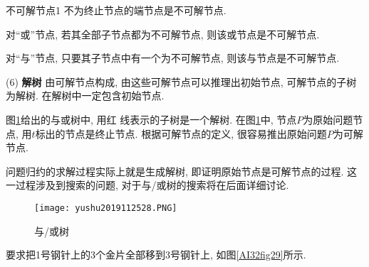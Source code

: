 \begin{mydef}{不可解节点}{1}
 不为终止节点的端节点是不可解节点.

 对“或”节点, 若其全部子节点都为不可解节点, 则该或节点是不可解节点.

 对“与”节点, 只要其子节点中有一个为不可解节点, 则该与节点是不可解节点.
\end{mydef}

(6) \textbf{解树} 由可解节点构成, 由这些可解节点可以推理出初始节点, 可解节点的子树为解树. 在解树中一定包含初始节点.
\begin{example}
    图\ref{AI32fig28}给出的与或树中, 用红 线表示的子树是一个解树. 在图\ref{AI32fig28}中, 节点$P$为原始问题节点, 用$t$标出的节点是终止节点. 根据可解节点的定义, 很容易推出原始问题$P$为可解节点.
\end{example}
\begin{remark}
    问题归约的求解过程实际上就是生成解树, 即证明原始节点是可解节点的过程. 这一过程涉及到搜索的问题, 对于与/或树的搜索将在后面详细讨论.
\end{remark}
\begin{figure}[H]
    \centering
    \texttt{[image: yushu2019112528.PNG]}
    \caption{与/或树 }
    \label{AI32fig28}
\end{figure}
\begin{example}
     要求把1号钢针上的3个金片全部移到3号钢针上, 如图\ref{AI32fig29}所示.
\end{example}
